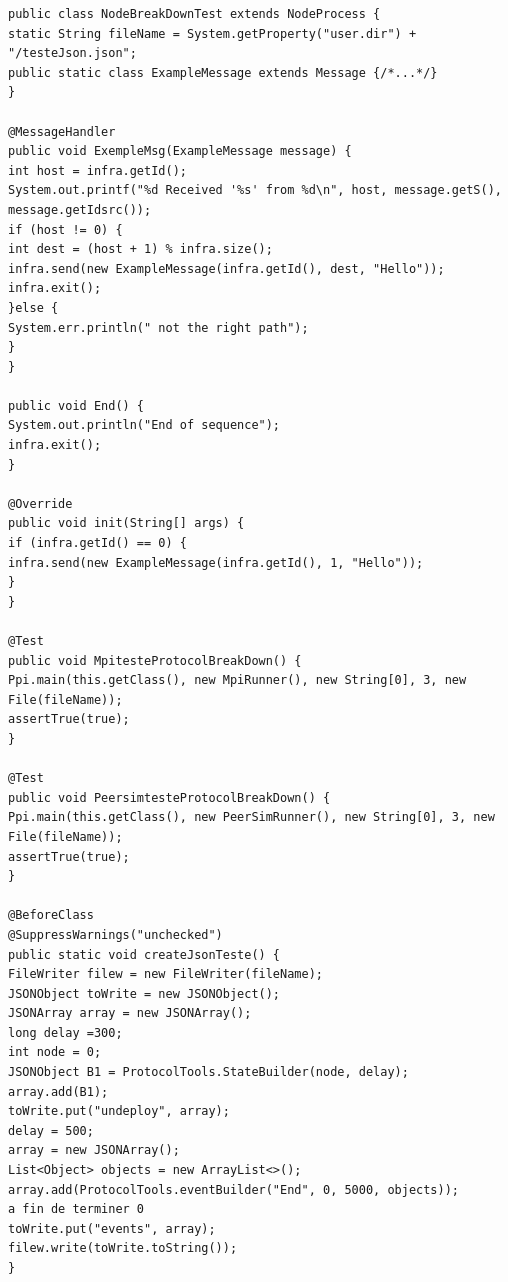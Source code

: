 \documentclass{article}
\begin{document}
\begin{lstlisting}
public class NodeBreakDownTest extends NodeProcess {
static String fileName = System.getProperty("user.dir") + "/testeJson.json";
public static class ExampleMessage extends Message {/*...*/}
}

@MessageHandler
public void ExempleMsg(ExampleMessage message) {
int host = infra.getId();
System.out.printf("%d Received '%s' from %d\n", host, message.getS(), message.getIdsrc());
if (host != 0) {
int dest = (host + 1) % infra.size();
infra.send(new ExampleMessage(infra.getId(), dest, "Hello"));
infra.exit();
}else {
System.err.println(" not the right path");
}
}

public void End() {
System.out.println("End of sequence");
infra.exit();
}

@Override
public void init(String[] args) {
if (infra.getId() == 0) {
infra.send(new ExampleMessage(infra.getId(), 1, "Hello"));
}
}

@Test
public void MpitesteProtocolBreakDown() {
Ppi.main(this.getClass(), new MpiRunner(), new String[0], 3, new File(fileName));
assertTrue(true);
}

@Test
public void PeersimtesteProtocolBreakDown() {
Ppi.main(this.getClass(), new PeerSimRunner(), new String[0], 3, new File(fileName));
assertTrue(true);
}

@BeforeClass
@SuppressWarnings("unchecked")
public static void createJsonTeste() {
FileWriter filew = new FileWriter(fileName);
JSONObject toWrite = new JSONObject();
JSONArray array = new JSONArray();
long delay =300;
int node = 0;
JSONObject B1 = ProtocolTools.StateBuilder(node, delay);
array.add(B1);
toWrite.put("undeploy", array);
delay = 500;
array = new JSONArray();
List<Object> objects = new ArrayList<>();
array.add(ProtocolTools.eventBuilder("End", 0, 5000, objects));
a fin de terminer 0
toWrite.put("events", array);
filew.write(toWrite.toString());
}
\end{lstlisting}
\end{document}
